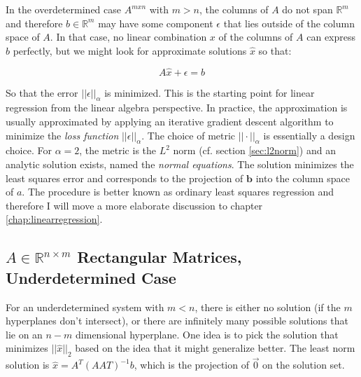In the overdetermined case $A^{mxn}$ with $m>n$, the columns of $A$ do not span $\mathbb{R}^m$ and therefore $b\in\mathbb{R}^m$ may have some component $\epsilon$ that lies outside of the column space of $A$. In that case, no linear combination $x$ of the columns of $A$ can express $b$ perfectly, but we might look for approximate solutions $\hat{x}$ so that:

\begin{equation}
A\hat{x} + \epsilon = b
\end{equation}

So that the error $||\epsilon||_{\alpha}$ is minimized. This is the starting point for linear regression from the linear algebra perspective. In practice, the approximation is usually approximated by applying an iterative gradient descent algorithm to minimize the \textit{loss function} $||\epsilon||_{\alpha}$. The choice of metric $||\cdot||_{\alpha}$ is essentially a design choice. For $\alpha=2$, the metric is the $L^2$ norm (cf. section \ref{sec:l2norm}) and an analytic solution exists, named the \textit{normal equations}. The solution minimizes the least squares error and corresponds to the projection of $\mathbf{b}$ into the column space of $a$. The procedure is better known as ordinary least squares regression and therefore I will move a more elaborate discussion to chapter \ref{chap:linearregression}.



\subsection{$A\in\mathbb{R}^{n\times m}$ Rectangular Matrices, Underdetermined Case}
For an underdetermined system with $m<n$, there is either no solution (if the $m$ hyperplanes don't intersect), or there are infinitely many possible solutions that lie on an $n-m$ dimensional hyperplane. One idea is to pick the solution that minimizes $||\hat{x}||_2$ based on the idea that it might generalize better. The least norm solution is $\hat{x} = A^T\left(AAT\right)^{-1}b$, which is the projection of $\vec{0}$ on the solution set.
